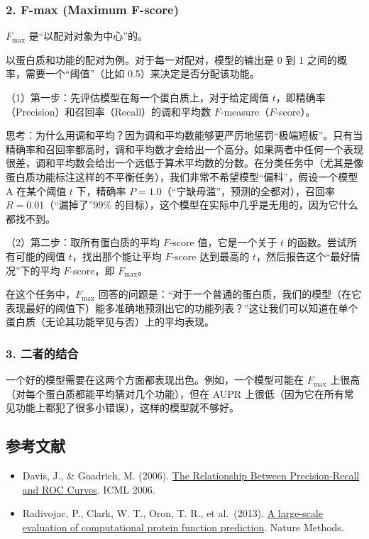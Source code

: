 \hypertarget{f-max-maximum-f-score}{%
\subsubsection{2. F-max (Maximum F-score)}\label{f-max-maximum-f-score}}

\(F_{\max}\) 是``以配对对象为中心''的。

以蛋白质和功能的配对为例。对于每一对配对，模型的输出是 0 到 1 之间的概率，需要一个``阈值''（比如 0.5）来决定是否分配该功能。

（1）第一步：先评估模型在每一个蛋白质上，对于给定阈值 \(t\)，即精确率（Precision）和召回率（Recall）的调和平均数 \(F\)-measure（\(F\)-score）。

思考：为什么用调和平均？因为调和平均数能够更严厉地惩罚``极端短板''。只有当精确率和召回率都高时，调和平均数才会给出一个高分。如果两者中任何一个表现很差，调和平均数会给出一个远低于算术平均数的分数。在分类任务中（尤其是像蛋白质功能标注这样的不平衡任务），我们非常不希望模型``偏科''，假设一个模型 A 在某个阈值 \(t\) 下，精确率 \(P=1.0\)（``宁缺毋滥''，预测的全都对），召回率 \(R=0.01\)（``漏掉了''\(99\%\) 的目标），这个模型在实际中几乎是无用的，因为它什么都找不到。

（2）第二步：取所有蛋白质的平均 \(F\)-score 值，它是一个关于 \(t\) 的函数。尝试所有可能的阈值 \(t\)，找出那个能让平均 \(F\)-score 达到最高的 \(t\)，然后报告这个``最好情况''下的平均 \(F\)-score，即 \(F_{\max}\)。

在这个任务中，\(F_{\max}\) 回答的问题是：``对于一个普通的蛋白质，我们的模型（在它表现最好的阈值下）能多准确地预测出它的功能列表？''这让我们可以知道在单个蛋白质（无论其功能罕见与否）上的平均表现。

\hypertarget{ux4e8cux8005ux7684ux7ed3ux5408}{%
\subsubsection{3. 二者的结合}\label{ux4e8cux8005ux7684ux7ed3ux5408}}

一个好的模型需要在这两个方面都表现出色。例如，一个模型可能在 \(F_{\max}\) 上很高（对每个蛋白质都能平均猜对几个功能），但在 AUPR 上很低（因为它在所有常见功能上都犯了很多小错误），这样的模型就不够好。

\FloatBarrier
{}
\hypertarget{ux53c2ux8003ux6587ux732e-33}{%
\subsection{参考文献}\label{ux53c2ux8003ux6587ux732e-33}}

\vspace{0.25em}
\begin{itemize}
\tightlist
\item
  Davis, J., \& Goadrich, M. (2006). \href{https://doi.org/10.1145/1143844.1143874}{The Relationship Between Precision-Recall and ROC Curves}. ICML 2006.
\item
  Radivojac, P., Clark, W. T., Oron, T. R., et al.~(2013). \href{https://www.nature.com/articles/nmeth.2340}{A large-scale evaluation of computational protein function prediction}. Nature Methods.
\end{itemize}

\clearpage

